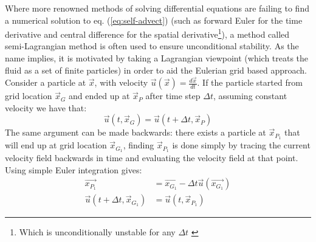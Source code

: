 \label{sec:self-advection-implementation}
Where more renowned methods of solving differential equations are failing to find a numerical solution to eq. (\ref{eq:self-advect}) (such as forward Euler for the time derivative and central difference for the spatial derivative\footnote{Which is unconditionally unstable for any \begin{math}\Delta t\end{math} \cite[p.~28]{bridson}}), a method called semi-Lagrangian method is often used to ensure unconditional stability. As the name implies, it is motivated by taking a Lagrangian viewpoint (which treats the fluid as a set of finite particles) in order to aid the Eulerian grid based approach. Consider a particle at  \begin{math}\vec{x}\end{math}, with velocity \begin{math}\vec{u}(\vec{x}) = \frac{d\vec{x}}{dt}\end{math}. If the particle started from grid location \begin{math}\vec{x}_G\end{math} and ended up at \begin{math}\vec{x}_P\end{math} after time step \begin{math}\Delta t \end{math}, assuming constant velocity we have that: 
\begin{equation}
\label{eq:lagrangian-arg}
\vec{u}(t,\vec{x}_G) = \vec{u}(t+\Delta t,\vec{x}_P)  
\end{equation}
The same argument can be made backwards: there exists a particle at \begin{math}\vec{x}_{P_1} \end{math} that will end up at grid location \begin{math}\vec{x}_{G_1}\end{math}, finding \begin{math}\vec{x}_{P_1}\end{math} is done simply by tracing the current velocity field backwards in time and evaluating the velocity field at that point. Using simple Euler integration gives: 
	\begin{align}
					      \label{eq:lagrangian}\vec{x_{P_1}}  & =    \vec{x_{G_1}} -  \Delta t \vec{u}(\vec{x_{G_1}})  \\ 
		\label{eq:lagrangian-arg-reverse}\vec{u}(t + \Delta t,\vec{x}_{G_1}) &  =    \vec{u}(t,\vec{x}_{P_1}) 
	\end{align}
